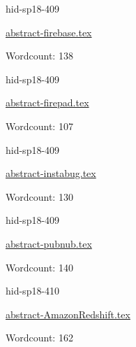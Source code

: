 

\begin{IU}

hid-sp18-409

\href{https://github.com/cloudmesh-community/hid-sp18-409/blob/master//technology/abstract-firebase.tex}{abstract-firebase.tex}

 

Wordcount: 138

\end{IU}



\begin{IU}

hid-sp18-409

\href{https://github.com/cloudmesh-community/hid-sp18-409/blob/master//technology/abstract-firepad.tex}{abstract-firepad.tex}

 

Wordcount: 107

\end{IU}



\begin{IU}

hid-sp18-409

\href{https://github.com/cloudmesh-community/hid-sp18-409/blob/master//technology/abstract-instabug.tex}{abstract-instabug.tex}

 

Wordcount: 130

\end{IU}



\begin{IU}

hid-sp18-409

\href{https://github.com/cloudmesh-community/hid-sp18-409/blob/master//technology/abstract-pubnub.tex}{abstract-pubnub.tex}

 

Wordcount: 140

\end{IU}



\begin{IU}

hid-sp18-410

\href{https://github.com/cloudmesh-community/hid-sp18-410/blob/master//technology/abstract-AmazonRedshift.tex}{abstract-AmazonRedshift.tex}

 

Wordcount: 162

\end{IU}

